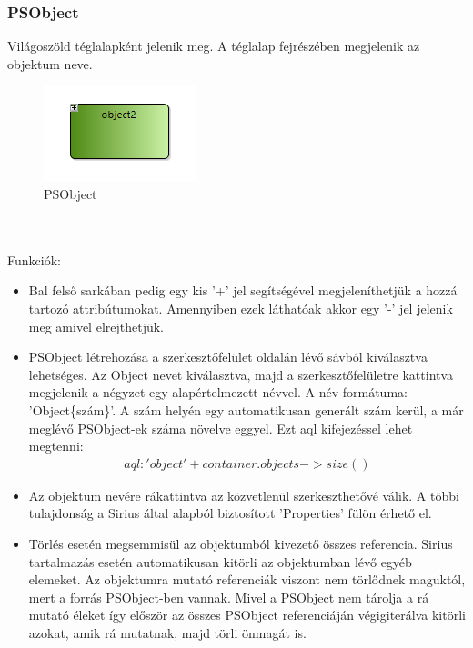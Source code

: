 \subsubsection{PSObject}
Világoszöld téglalapként jelenik meg.  A téglalap fejrészében megjelenik az objektum neve.
\begin{figure}[!ht]
	\centering
	\includegraphics{figures/obj.PNG}
	\caption{PSObject}
	\label{obj} 
\end{figure}
\\\\
Funkciók:
\begin{itemize}  	
	\item Bal felső sarkában pedig egy kis '+' jel segítségével megjeleníthetjük a hozzá tartozó attribútumokat. Amennyiben ezek láthatóak akkor egy '-' jel jelenik meg amivel elrejthetjük. 	
	
	\item PSObject létrehozása a szerkesztőfelület oldalán lévő sávból kiválasztva lehetséges. Az Object nevet kiválasztva, majd a szerkesztőfelületre kattintva megjelenik a négyzet egy alapértelmezett névvel. A név formátuma: 'Object\{szám\}'. A szám helyén egy automatikusan generált szám kerül, a már meglévő PSObject-ek száma növelve eggyel. Ezt aql kifejezéssel lehet megtenni: 
	\begin{align}
	aql:'object'+container.objects->size()
	\end{align}	

	\item Az objektum nevére rákattintva az közvetlenül szerkeszthetővé válik. A többi tulajdonság a Sirius által alapból biztosított 'Properties' fülön érhető el. 
	
	\item Törlés esetén megsemmisül az objektumból kivezető összes referencia. Sirius tartalmazás esetén automatikusan kitörli az objektumban lévő egyéb elemeket. Az objektumra mutató referenciák viszont nem törlődnek maguktól, mert a forrás PSObject-ben vannak. Mivel a PSObject nem tárolja a rá mutató éleket így először az összes PSObject referenciáján végigiterálva kitörli azokat, amik rá mutatnak, majd törli önmagát is. 
\end{itemize}


